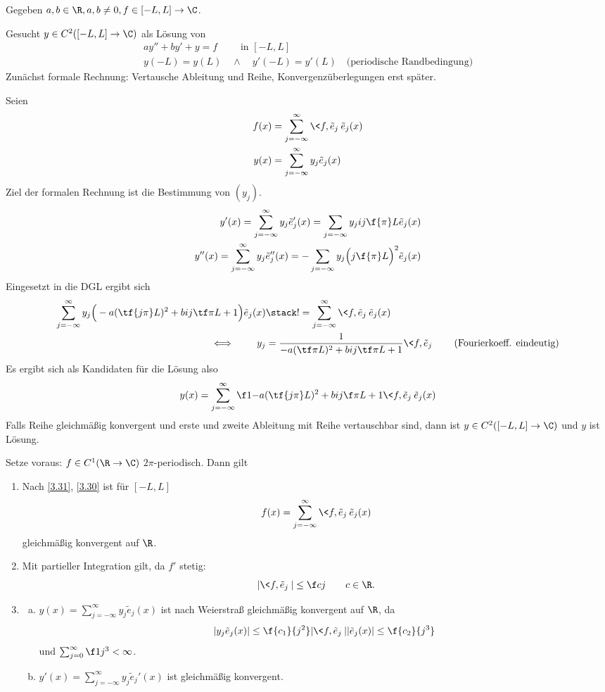 \begin{ex} \label{3.36}
	Gegeben $a,b \in \R, a,b \neq 0, f \in [-L,L] \to \C$.

	Gesucht $y \in C^2([-L,L] \to \C)$ als Lösung von 
	\begin{gather*}
		ay'' + by' + y = f \qquad \text{ in $[-L,L]$} \\
		y(-L) = y(L) \quad \land \quad y'(-L) = y'(L) \quad \text{(periodische Randbedingung)}
	\end{gather*}
	Zunächst formale Rechnung: Vertausche Ableitung und Reihe, Konvergenzüberlegungen erst später.

	Seien
	\begin{align*}
		f(x) &= \sum_{j=-\infty}^\infty \<f,\tilde e_j\> \tilde e_j(x) \\
		y(x) &= \sum_{j=-\infty}^\infty y_j \tilde e_j(x)
	\end{align*}
	Ziel der formalen Rechnung ist die Bestimmung von $(y_j)$.
	\begin{align*}
		y'(x) = \sum_{j=-\infty}^\infty y_j \tilde e_j'(x) = \sum_{j=-\infty} y_j ij \f {\pi}L \tilde e_j(x) \\
		y''(x) = \sum_{j=-\infty}^\infty y_j \tilde e_j''(x) = -\sum_{j=-\infty} y_j \Big( j \f {\pi}L \Big)^2 \tilde e_j(x) 
	\end{align*}
	Eingesetzt in die DGL ergibt sich
	\begin{align*}
		\sum_{j=-\infty}^\infty y_j\Big( -a (\tf {j\pi}L)^2 + b ij \tf \pi L + 1 \Big) \tilde e_j(x)
		&\stack != \sum_{j=-\infty}^\infty \<f, \tilde e_j\> \tilde e_j(x) \\
		\iff \qquad y_j &= \dfrac 1{-a (\tf \pi L)^2 + b ij \tf \pi L + 1} \<f,\tilde e_j\>
		\qquad \text{(Fourierkoeff. eindeutig)}
	\end{align*}
	Es ergibt sich als Kandidaten für die Lösung also
	\[
		y(x) = \sum_{j=-\infty}^\infty \f 1{-a (\tf {j\pi}L )^2 + b ij \f \pi L + 1} \<f, \tilde e_j\> \tilde e_j(x)
	\]
	Falls Reihe gleichmäßig konvergent und erste und zweite Ableitung mit Reihe vertauschbar sind, dann ist $y \in C^2([-L,L]\to \C)$ und $y$ ist Lösung.

	Setze voraus: $f \in C^1(\R \to \C)$ $2\pi$-periodisch.
	Dann gilt
	\begin{enumerate}[1)]
		\item
			Nach \ref{3.31}, \ref{3.30} ist für $[-L,L]$
			\[
				f(x) = \sum_{j=-\infty}^\infty \<f,\tilde e_j\> \tilde e_j(x)
			\]
			gleichmäßig konvergent auf $\R$.
		\item
			Mit partieller Integration gilt, da $f'$ stetig:
			\[
				|\<f, \tilde e_j\>| \le \f c j \qquad c \in \R.
			\]
		\item
			\begin{enumerate}[a)]
				\item
					$y(x) = \sum_{j=-\infty}^\infty y_j \tilde e_j(x)$ ist nach Weierstraß gleichmäßig konvergent auf $\R$, da 
					\[
						|y_j \tilde e_j(x)| \le \f {c_1}{j^2} |\<f, \tilde e_j\>| |\tilde e_j(x)| \le \f {c_2}{j^3}
					\]
					 und $\sum_{j=0}^\infty \f 1{j^3} < \infty$.
				\item
					$y'(x) = \sum_{j=-\infty}^\infty y_j \tilde e_j'(x)$ ist gleichmäßig konvergent.


\end{enumerate}
\end{enumerate}
\end{ex}
